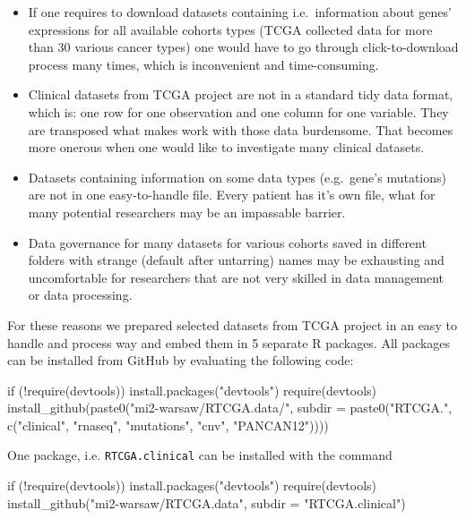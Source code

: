 \begin{itemize}
\itemsep1pt\parskip0pt
\item
  If one requires to download datasets containing i.e.~information about
  genes' expressions for all available cohorts types (TCGA collected
  data for more than 30 various cancer types) one would have to go
  through click-to-download process many times, which is inconvenient
  and time-consuming.
\item
  Clinical datasets from TCGA project are not in a standard tidy data
  format, which is: one row for one observation and one column for one
  variable. They are transposed what makes work with those data
  burdensome. That becomes more onerous when one would like to
  investigate many clinical datasets.
\item
  Datasets containing information on some data types (e.g.~gene's
  mutations) are not in one easy-to-handle file. Every patient has it's
  own file, what for many potential researchers may be an impassable
  barrier.
\item
  Data governance for many datasets for various cohorts saved in
  different folders with strange (default after untarring) names may be
  exhausting and uncomfortable for researchers that are not very skilled
  in data management or data processing.
\end{itemize}

For these reasons we prepared selected datasets from TCGA project in an
easy to handle and process way and embed them in 5 separate R packages.
All packages can be installed from GitHub by evaluating the following
code:

\begin{Schunk}
\begin{Sinput}
if (!require(devtools)) {
    install.packages("devtools")
    require(devtools)
}
install_github(paste0("mi2-warsaw/RTCGA.data/", 
                  subdir = paste0("RTCGA.", 
   c("clinical", "rnaseq", "mutations", "cnv", "PANCAN12"))))
\end{Sinput}
\end{Schunk}

One package, i.e. \texttt{RTCGA.clinical} can be installed with the
command

\begin{Schunk}
\begin{Sinput}
if (!require(devtools)) {
    install.packages("devtools")
    require(devtools)
}
install_github("mi2-warsaw/RTCGA.data", 
                subdir = "RTCGA.clinical") 
\end{Sinput}
\end{Schunk}

